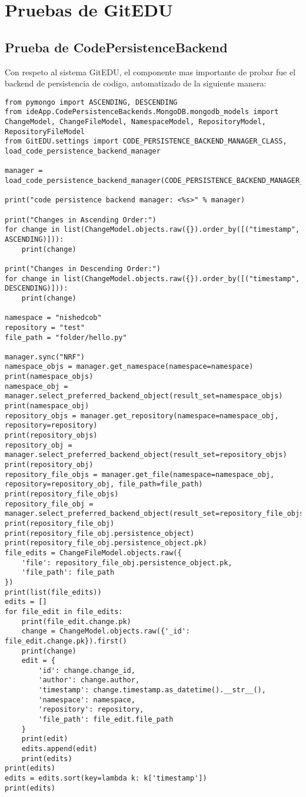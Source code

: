 
\chapter{Pruebas de GitEDU}
\label{AnexoF}

\section{Prueba de CodePersistenceBackend}
Con respeto al sistema GitEDU, el componente mas importante de probar fue el backend de persistencia de codigo, automatizado de la siguiente manera:
\lstset{language=Python}
\begin{lstlisting}[breaklines]
from pymongo import ASCENDING, DESCENDING
from ideApp.CodePersistenceBackends.MongoDB.mongodb_models import ChangeModel, ChangeFileModel, NamespaceModel, RepositoryModel, RepositoryFileModel
from GitEDU.settings import CODE_PERSISTENCE_BACKEND_MANAGER_CLASS, load_code_persistence_backend_manager

manager = load_code_persistence_backend_manager(CODE_PERSISTENCE_BACKEND_MANAGER_CLASS)

print("code persistence backend manager: <%s>" % manager)

print("Changes in Ascending Order:")
for change in list(ChangeModel.objects.raw({}).order_by([("timestamp", ASCENDING)])):
    print(change)

print("Changes in Descending Order:")
for change in list(ChangeModel.objects.raw({}).order_by([("timestamp", DESCENDING)])):
    print(change)

namespace = "nishedcob"
repository = "test"
file_path = "folder/hello.py"

manager.sync("NRF")
namespace_objs = manager.get_namespace(namespace=namespace)
print(namespace_objs)
namespace_obj = manager.select_preferred_backend_object(result_set=namespace_objs)
print(namespace_obj)
repository_objs = manager.get_repository(namespace=namespace_obj, repository=repository)
print(repository_objs)
repository_obj = manager.select_preferred_backend_object(result_set=repository_objs)
print(repository_obj)
repository_file_objs = manager.get_file(namespace=namespace_obj, repository=repository_obj, file_path=file_path)
print(repository_file_objs)
repository_file_obj = manager.select_preferred_backend_object(result_set=repository_file_objs)
print(repository_file_obj)
print(repository_file_obj.persistence_object)
print(repository_file_obj.persistence_object.pk)
file_edits = ChangeFileModel.objects.raw({
    'file': repository_file_obj.persistence_object.pk,
    'file_path': file_path
})
print(list(file_edits))
edits = []
for file_edit in file_edits:
    print(file_edit.change.pk)
    change = ChangeModel.objects.raw({'_id': file_edit.change.pk}).first()
    print(change)
    edit = {
        'id': change.change_id,
        'author': change.author,
        'timestamp': change.timestamp.as_datetime().__str__(),
        'namespace': namespace,
        'repository': repository,
        'file_path': file_edit.file_path
    }
    print(edit)
    edits.append(edit)
    print(edits)
print(edits)
edits = edits.sort(key=lambda k: k['timestamp'])
print(edits)
\end{lstlisting}
